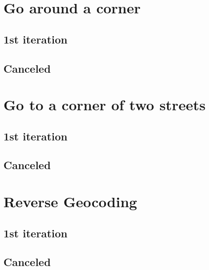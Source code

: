 		\section{Go around a corner}
			\subsection{1st iteration}
			\subsection{Canceled}
		\section{Go to a corner of two streets}
			\subsection{1st iteration}
			\subsection{Canceled}
		\section{Reverse Geocoding}
			\subsection{1st iteration}
			\subsection{Canceled}
		
		